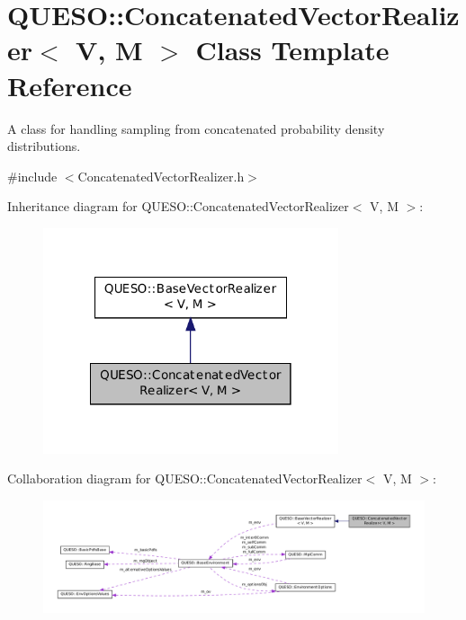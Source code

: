 \hypertarget{class_q_u_e_s_o_1_1_concatenated_vector_realizer}{\section{Q\-U\-E\-S\-O\-:\-:Concatenated\-Vector\-Realizer$<$ V, M $>$ Class Template Reference}
\label{class_q_u_e_s_o_1_1_concatenated_vector_realizer}
}


A class for handling sampling from concatenated probability density distributions.  




{\ttfamily \#include $<$Concatenated\-Vector\-Realizer.\-h$>$}



Inheritance diagram for Q\-U\-E\-S\-O\-:\-:Concatenated\-Vector\-Realizer$<$ V, M $>$\-:
\nopagebreak
\begin{figure}[H]
\begin{center}
\leavevmode
\includegraphics[width=246pt]{class_q_u_e_s_o_1_1_concatenated_vector_realizer__inherit__graph}
\end{center}
\end{figure}


Collaboration diagram for Q\-U\-E\-S\-O\-:\-:Concatenated\-Vector\-Realizer$<$ V, M $>$\-:
\nopagebreak
\begin{figure}[H]
\begin{center}
\leavevmode
\includegraphics[width=350pt]{class_q_u_e_s_o_1_1_concatenated_vector_realizer__coll__graph}
\end{center}
\end{figure}
